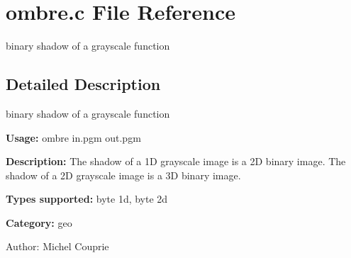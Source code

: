 \section{ombre.c File Reference}
\label{ombre_8c}
binary shadow of a grayscale function  




\label{_details}
\subsection{Detailed Description}
binary shadow of a grayscale function 

{\bf Usage:} ombre in.pgm out.pgm

{\bf Description:} The shadow of a 1D grayscale image is a 2D binary image. The shadow of a 2D grayscale image is a 3D binary image.

{\bf Types supported:} byte 1d, byte 2d

{\bf Category:} geo

\begin{Desc}
\item[Author:]Michel Couprie \end{Desc}

